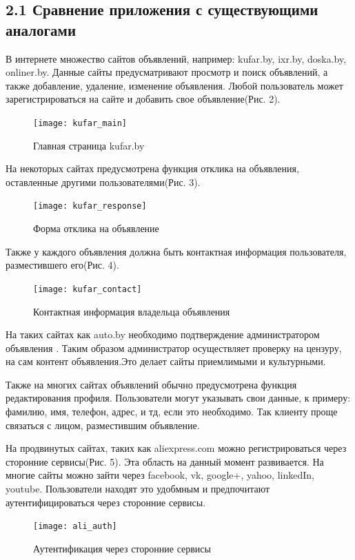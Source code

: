 \documentclass[14pt,a4paper]{extreport}
\begin{document}
	\subsection*{\normalsize\hspace{4ex}2.1 Сравнение приложения с существующими аналогами}
	\hspace{2ex} В интернете множество сайтов объявлений, например: kufar.by, ixr.by, doska.by, onliner.by. Данные сайты предусматривают просмотр и поиск объявлений, а также добавление, удаление, изменение объявления. Любой пользователь может зарегистрироваться на сайте и добавить свое объявление(Рис. 2).
	\begin{figure}[h]
	\begin{center}
	\texttt{[image: kufar\_main]}
	\caption{Главная страница kufar.by}
	\end{center}
	\end{figure}
	
 	На некоторых сайтах предусмотрена функция отклика на объявления, оставленные другими пользователями(Рис. 3).
	\begin{figure}[h]
	\begin{center}
	\texttt{[image: kufar\_response]}
	\caption{Форма отклика на объявление}
	\end{center}
	\end{figure}
		
	 Также у каждого объявления должна быть контактная информация пользователя, разместившего его(Рис. 4).
	\begin{figure}[h]
	\begin{center}
	\texttt{[image: kufar\_contact]}
	\caption{Контактная информация владельца объявления}
	\end{center}
	\end{figure}
	
	 На таких сайтах как auto.by необходимо подтверждение администратором объявления . Таким образом администратор осуществляет проверку на цензуру, на сам контент объявления.Это делает сайты приемлимыми и культурными.\par
	Также на многих сайтах объявлений обычно предусмотрена функция редактирования профиля. Пользователи могут указывать свои данные, к примеру: фамилию, имя, телефон, адрес, и тд, если это необходимо. Так клиенту проще связаться с лицом, разместившим объявление.\par
	 На продвинутых сайтах, таких как aliexpress.com можно регистрироваться через сторонние сервисы(Рис. 5). Эта область на данный момент развивается. На многие сайты можно зайти через facebook, vk, google+, yahoo, linkedIn, youtube. Пользователи находят это удобмным и предпочитают аутентифицироваться через сторонние сервисы.\par
	\begin{figure}[h]
	\begin{center}
	\texttt{[image: ali\_auth]}
	\caption{Аутентификация через сторонние сервисы}
	\end{center}
	\end{figure}
	
\end{document}
